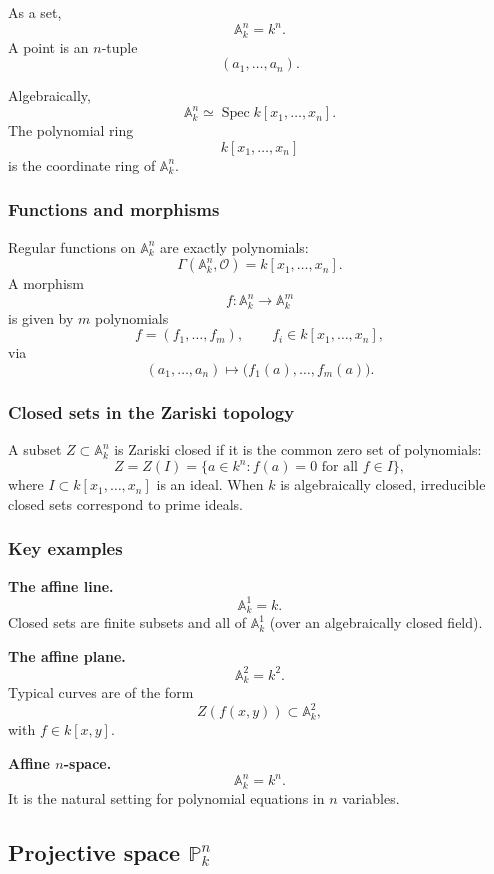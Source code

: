 \documentclass[12pt,a4paper]{article}
\theoremstyle{plain}
\theoremstyle{definition}      %
\begin{document}
As a set,
\[
\mathbb A^n_k = k^n.
\]
A point is an \(n\)-tuple
\[
(a_1,\dots,a_n).
\]

Algebraically,
\[
\mathbb A^n_k \simeq \operatorname{Spec} k[x_1,\dots,x_n].
\]
The polynomial ring
\[
k[x_1,\dots,x_n]
\]
is the coordinate ring of \(\mathbb A^n_k\).

\subsubsection*{Functions and morphisms}

Regular functions on \(\mathbb A^n_k\) are exactly polynomials:
\[
\Gamma(\mathbb A^n_k,\mathcal O)=k[x_1,\dots,x_n].
\]
A morphism
\[
f:\mathbb A^n_k\to\mathbb A^m_k
\]
is given by \(m\) polynomials
\[
f=(f_1,\dots,f_m),
\qquad
f_i\in k[x_1,\dots,x_n],
\]
via
\[
(a_1,\dots,a_n)\mapsto \bigl(f_1(a),\dots,f_m(a)\bigr).
\]

\subsubsection*{Closed sets in the Zariski topology}

A subset \(Z\subset \mathbb A^n_k\) is Zariski closed if it is the common zero set of polynomials:
\[
Z = Z(I)
=
\{a\in k^n : f(a)=0 \text{ for all } f\in I\},
\]
where \(I\subset k[x_1,\dots,x_n]\) is an ideal.
When \(k\) is algebraically closed, irreducible closed sets correspond to prime ideals.

\subsubsection*{Key examples}

\textbf{The affine line.}
\[
\mathbb A^1_k = k.
\]
Closed sets are finite subsets and all of \(\mathbb A^1_k\) (over an algebraically closed field).

\textbf{The affine plane.}
\[
\mathbb A^2_k = k^2.
\]
Typical curves are of the form
\[
Z(f(x,y))\subset \mathbb A^2_k,
\]
with \(f\in k[x,y]\).

\textbf{Affine \(n\)-space.}
\[
\mathbb A^n_k = k^n.
\]
It is the natural setting for polynomial equations in \(n\) variables.



\subsection*{Projective space \(\mathbb P^n_k\)}
\end{document}
